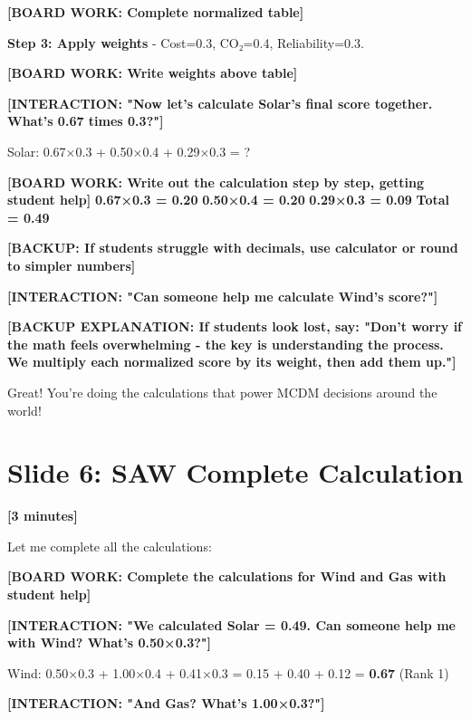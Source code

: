 \documentclass[12pt]{article}
\begin{document}
\textcolor{speakernote}{\textbf{[BOARD WORK: Complete normalized table]}}

\textcolor{emphasis}{\textbf{Step 3: Apply weights}} - Cost=0.3, CO₂=0.4, Reliability=0.3.

\textcolor{speakernote}{\textbf{[BOARD WORK: Write weights above table]}}

\textcolor{speakernote}{\textbf{[INTERACTION: "Now let's calculate Solar's final score together. What's 0.67 times 0.3?"]}}

Solar: 0.67×0.3 + 0.50×0.4 + 0.29×0.3 = ?

\textcolor{speakernote}{\textbf{[BOARD WORK: Write out the calculation step by step, getting student help]}}
\textcolor{speakernote}{\textbf{0.67×0.3 = 0.20}}
\textcolor{speakernote}{\textbf{0.50×0.4 = 0.20}}
\textcolor{speakernote}{\textbf{0.29×0.3 = 0.09}}
\textcolor{speakernote}{\textbf{Total = 0.49}}

\textcolor{speakernote}{\textbf{[BACKUP: If students struggle with decimals, use calculator or round to simpler numbers]}}

\textcolor{speakernote}{\textbf{[INTERACTION: "Can someone help me calculate Wind's score?"]}}

\textcolor{speakernote}{\textbf{[BACKUP EXPLANATION: If students look lost, say: "Don't worry if the math feels overwhelming - the key is understanding the process. We multiply each normalized score by its weight, then add them up."]}}

Great! You're doing the calculations that power MCDM decisions around the world!

\section*{Slide 6: SAW Complete Calculation}
\textcolor{timing}{\textbf{[3 minutes]}}

Let me complete all the calculations:

\textcolor{speakernote}{\textbf{[BOARD WORK: Complete the calculations for Wind and Gas with student help]}}

\textcolor{speakernote}{\textbf{[INTERACTION: "We calculated Solar = 0.49. Can someone help me with Wind? What's 0.50×0.3?"]}}

Wind: 0.50×0.3 + 1.00×0.4 + 0.41×0.3 = 0.15 + 0.40 + 0.12 = \textcolor{emphasis}{\textbf{0.67}} (Rank 1)

\textcolor{speakernote}{\textbf{[INTERACTION: "And Gas? What's 1.00×0.3?"]}}
\end{document}
